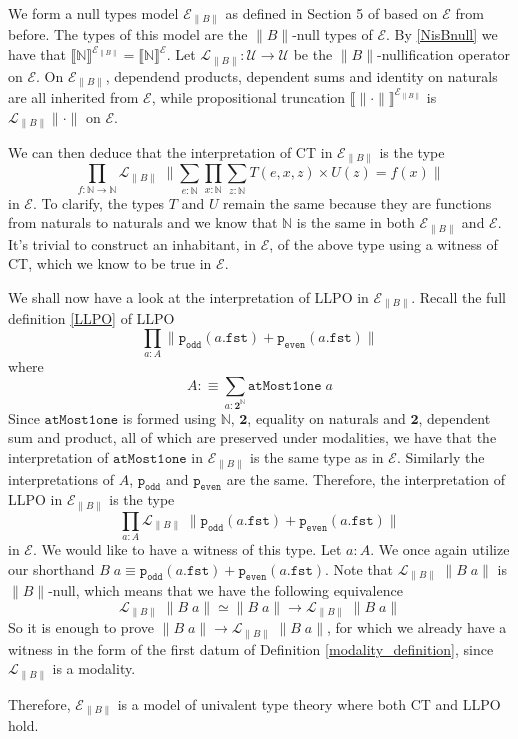 \documentclass[12pt]{report}
\begin{document}
We form a null types model $\mathcal{E}_{\lVert B \rVert}$ as defined in Section 5 of \cite{1905.03014} based on $\mathcal{E}$ from before. 
The types of this model are the $\lVert B \rVert $-null types of $\mathcal{E}$. 
By \cref{NisBnull} we have that $\llbracket \mathbb{N} \rrbracket^{\mathcal{E}_{\lVert B \rVert}} = \llbracket \mathbb{N} \rrbracket^\mathcal{E}$. 
Let $\mathcal{L}_{\lVert B \rVert} : \mathcal{U} \rightarrow \mathcal{U}$ be the $\lVert B \rVert$-nullification operator on $\mathcal{E}$. 
On $\mathcal{E}_{\lVert B \rVert}$, dependend products, dependent sums and identity on naturals are all inherited from $\mathcal{E}$, while propositional truncation $\llbracket \lVert \cdot \rVert \rrbracket^{\mathcal{E}_{\lVert B \rVert}}$ is $\mathcal{L}_{\lVert B \rVert} \lVert\cdot \rVert $ on $\mathcal{E}$.

We can then deduce that the interpretation of CT in $\mathcal{E}_{\lVert B \rVert}$ is the type 
$$\prod_{f : \mathbb{N}\rightarrow \mathbb{N}} \mathcal{L}_{\lVert B \rVert}\;\Big\lVert \sum_{e : \mathbb{N}} \prod_{x : \mathbb{N}} \sum_{z : \mathbb{N}} T(e,x,z) \times U(z) = f(x) \Big\rVert$$
in $\mathcal{E}$. To clarify, the types $T$ and $U$ remain the same because they are functions from naturals to naturals and we know that $\mathbb{N}$ is the same in both $\mathcal{E}_{\lVert B \rVert}$ and $\mathcal{E}$. 
It's trivial to construct an inhabitant, in $\mathcal{E}$, of the above type using a witness of CT, which we know to be true in $\mathcal{E}$. 

We shall now have a look at the interpretation of LLPO in $\mathcal{E}_{\lVert B \rVert}$. 
Recall the full definition \ref{LLPO} of LLPO
$$\prod_{a : A}\lVert \mathtt{p_{odd}}(a.\mathtt{fst}) + \mathtt{p_{even}}(a.\mathtt{fst}) \rVert$$
where $$A :\equiv \sum_{a: \mathbf{2}^\mathbb{N}}\mathtt{atMost1one}\;a$$
Since $\mathtt{atMost1one}$ is formed using $\mathbb{N}$, $\mathbf{2}$, equality on naturals and $\mathbf{2}$, dependent sum and product, all of which are preserved under modalities, we have that the interpretation of $\mathtt{atMost1one}$ in $\mathcal{E}_{\lVert B \rVert}$ is the same type as in $\mathcal{E}$. 
Similarly the interpretations of $A$, $\mathtt{p_{odd}}$ and $\mathtt{p_{even}}$ are the same. 
Therefore, the interpretation of LLPO in $\mathcal{E}_{\lVert B \rVert}$ is the type 
$$\prod_{a : A}\mathcal{L}_{\lVert B \rVert}\;\lVert \mathtt{p_{odd}}(a.\mathtt{fst}) + \mathtt{p_{even}}(a.\mathtt{fst}) \rVert$$
in $\mathcal{E}$. 
We would like to have a witness of this type. 
Let $a : A$. 
We once again utilize our shorthand $B\; a \equiv \mathtt{p_{odd}}(a.\mathtt{fst}) + \mathtt{p_{even}}(a.\mathtt{fst})$. 
Note that $\mathcal{L}_{\lVert B \rVert}\;\lVert B\; a \rVert$ is $\lVert B \rVert$-null, which means that we have the following equivalence
$$\mathcal{L}_{\lVert B \rVert}\; \lVert B\;a\rVert \simeq \lVert B\; a \rVert \rightarrow \mathcal{L}_{\lVert B \rVert}\;\lVert B\; a \rVert$$
So it is enough to prove $\lVert B\; a \rVert \rightarrow \mathcal{L}_{\lVert B \rVert}\;\lVert B\; a \rVert$, for which we already have a witness in the form of the first datum of Definition \ref{modality_definition}, since $\mathcal{L}_{\lVert B \rVert}$ is a modality. 

Therefore, $\mathcal{E}_{\lVert B \rVert}$ is a model of univalent type theory where both CT and LLPO hold.

\printbibliography
\end{document}
